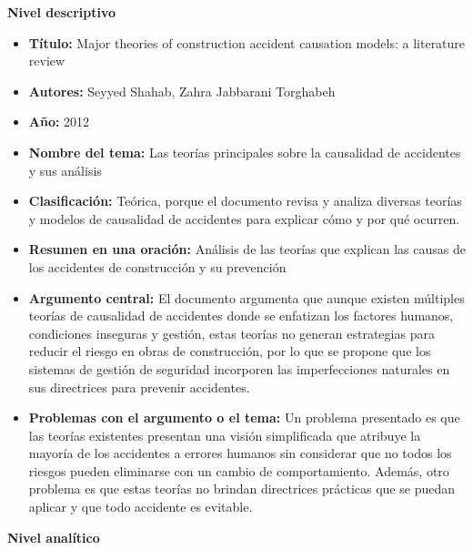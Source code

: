 \documentclass[12pt]{article}
\begin{document}
\textbf{Nivel descriptivo}
\begin{itemize}
    \item \textbf{Título:} Major theories of construction accident causation models: a literature review 

    \item \textbf{Autores:}  Seyyed Shahab, Zahra Jabbarani Torghabeh
    
    \item \textbf{Año:} 2012
    
    \item \textbf{Nombre del tema:} Las teorías principales sobre la causalidad de accidentes y sus análisis 
    
 \item \textbf{Clasificación:} Teórica, porque el documento revisa y analiza 
 diversas teorías y modelos de causalidad de accidentes para explicar cómo y por qué ocurren. 
    
    \item \textbf{Resumen en una oración:} Análisis de las teorías que 
    explican las causas de los accidentes de construcción y su prevención
    
    \item \textbf{Argumento central:} El documento argumenta que 
    aunque existen múltiples teorías de causalidad de accidentes donde se enfatizan los factores 
    humanos, condiciones inseguras y gestión, estas teorías no generan estrategias para reducir 
    el riesgo en obras de construcción, por lo que se propone que los sistemas de gestión de
    seguridad incorporen las imperfecciones naturales en sus directrices para prevenir accidentes. 
    
    \item \textbf{Problemas con el argumento o el tema:} Un problema presentado es que las 
    teorías existentes presentan una visión simplificada que atribuye la mayoría de los accidentes a 
    errores humanos sin considerar que no todos los riesgos pueden eliminarse con un cambio de comportamiento. 
    Además, otro problema es que estas teorías no brindan directrices prácticas 
    que se puedan aplicar y que todo accidente es evitable. 

\end{itemize}

\textbf{Nivel analítico}
\end{document}
